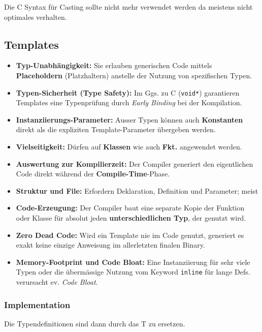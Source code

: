 Die C Syntax für Casting sollte nicht mehr verwendet werden da meistens nicht optimales verhalten. 
\subsection{Templates}

\begin{itemize}
\item \textbf{Typ-Unabhängigkeit:} Sie erlauben generischen Code mittels \textbf{Placeholdern} (Platzhaltern) anstelle der Nutzung von spezifischen Typen.
\item \textbf{Typen-Sicherheit (Type Safety):} Im Ggs. zu C (\lstinline|void*|) garantieren Templates eine Typenprüfung durch \textit{Early Binding} bei der Kompilation.
\item \textbf{Instanziierungs-Parameter:} Ausser Typen können auch \textbf{Konstanten} direkt als die expliziten Template-Parameter übergeben werden.
\item \textbf{Vielseitigkeit:} Dürfen auf \textbf{Klassen} wie auch \textbf{Fkt.} angewendet werden.
\item \textbf{Auswertung zur Kompilierzeit:} Der Compiler generiert den eigentlichen Code direkt während der \textbf{Compile-Time}-Phase.
\item \textbf{Struktur und File:} Erfordern Deklaration, Definition und Parameter; meist 
\item \textbf{Code-Erzeugung:} Der Compiler baut eine separate Kopie der Funktion oder Klasse für absolut jeden \textbf{unterschiedlichen Typ}, der genutzt wird.
\item \textbf{Zero Dead Code:} Wird ein Template nie im Code genutzt, generiert es exakt keine einzige Anweisung im allerletzten finalen Binary.
\item \textbf{Memory-Footprint und Code Bloat:} Eine Instanziierung für sehr viele Typen oder die übermässige Nutzung vom Keyword \lstinline|inline| für lange Defs. verursacht ev. \textit{Code Bloat}.
\end{itemize}

\subsubsection{Implementation}

Die Typendefinitionen sind dann durch das T zu ersetzen. 
\vspace{-1.5em}

